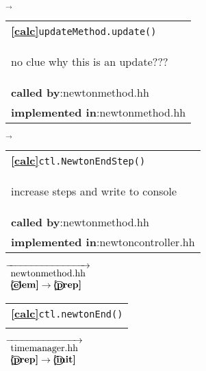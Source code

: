 \begin{landscape}
{\begin{tabular}{|l|}
      \hline 
  \end{tabular}
    $\overrightarrow{
    }$
    \nextline
    \begin{tabular}{|l|}
      \hline
      \textbf{\textcircled{\ref{calc}}}\verb+updateMethod.update()+ \\
      \begin{scriptsize}no clue why this is an update???\end{scriptsize}\\      
      \textbf{called by}:newtonmethod.hh\\
      \textbf{implemented in}:newtonmethod.hh \\  
      \hline 
  \end{tabular}
    $\overrightarrow{
    }$
    \begin{tabular}{|l|}
      \hline
      \textbf{\textcircled{\ref{calc}}}\verb+ctl.NewtonEndStep()+ \\
      \begin{scriptsize}increase steps and write to console\end{scriptsize}\\
      \textbf{called by}:newtonmethod.hh\\
      \textbf{implemented in}:newtoncontroller.hh\\  
      \hline 
  \end{tabular}
    {\scriptsize$\overrightarrow{
    \begin{array}{l}
     \textnormal{newtonmethod.hh}\\
     \textbf{\textcircled{\ref{elem}}} \rightarrow \textbf{\textcircled{\ref{prep}}}
    \end{array}
    }$}
    \begin{tabular}{|l|}
      \hline
      \textbf{\textcircled{\ref{calc}}}\verb+ctl.newtonEnd()+ \\
      \begin{scriptsize}\end{scriptsize}\\      
	\hline 
    \end{tabular}
    {\scriptsize$\overrightarrow{
    \begin{array}{l}
    \textnormal{timemanager.hh}\\
    \textbf{\textcircled{\ref{prep}}} \rightarrow \textbf{\textcircled{\ref{init}}}
    \end{array}
    }$}
}
\end{landscape}


\normalsize
